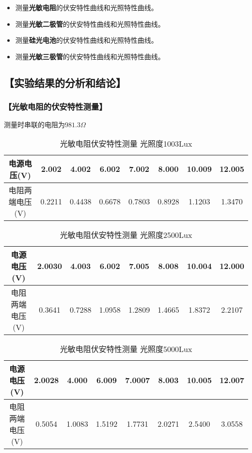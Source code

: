\documentclass{ctexart}
\let\oldsubsection\subsection
\renewcommand{\subsection}[1]{\oldsubsection{\!\!\!\!\!\!【#1】}}
\let\oldsubsubsection\subsubsection
\renewcommand{\subsubsection}[1]{\oldsubsubsection{\!\!\!\!\!\!【#1】}}
\begin{document}
\begin{itemize}
\item 测量\textbf{光敏电阻}的伏安特性曲线和光照特性曲线。
\item 测量\textbf{光敏二极管}的伏安特性曲线和光照特性曲线。
\item 测量\textbf{硅光电池}的伏安特性曲线和光照特性曲线。
\item 测量\textbf{光敏三极管}的伏安特性曲线和光照特性曲线。
\end{itemize}

\subsection{实验结果的分析和结论}

\subsubsection{光敏电阻的伏安特性测量}

测量时串联的电阻为$981.3\Omega$

\begin{table*}[!htbp]
  \centering
  \begin{tabular}{|c|c|c|c|c|c|c|c|}
    \hline
    电源电压(V) &2.002&4.002&6.002&7.002&8.000&10.009&12.005\\\hline
    电阻两端电压(V) &0.2211&0.4438&0.6678&0.7803&0.8928&1.1203&1.3470\\\hline
  \end{tabular}
  \caption{光敏电阻伏安特性测量 光照度1003Lux}
\end{table*}

\begin{table*}[!htbp]
  \centering
  \begin{tabular}{|c|c|c|c|c|c|c|c|}
    \hline
    电源电压(V) &2.0030&4.003&6.002&7.005&8.008&10.004&12.000\\\hline
    电阻两端电压(V) &0.3641&0.7288&1.0958&1.2809&1.4665&1.8372&2.2107\\\hline
  \end{tabular}
  \caption{光敏电阻伏安特性测量 光照度2500Lux}
\end{table*}

\begin{table*}[!htbp]
  \centering
  \begin{tabular}{|c|c|c|c|c|c|c|c|}
    \hline
    电源电压(V) &2.0028&4.000&6.009&7.0007&8.003&10.005&12.007\\\hline
    电阻两端电压(V) &0.5054&1.0083&1.5192&1.7731&2.0271&2.5400&3.0558\\\hline
  \end{tabular}
  \caption{光敏电阻伏安特性测量 光照度5000Lux}
\end{table*}
\end{document}
